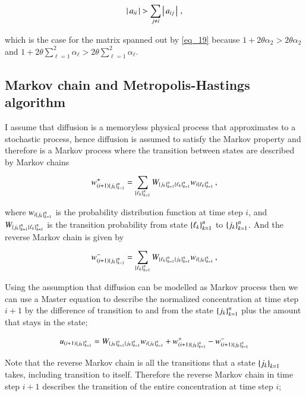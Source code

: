 \documentclass[11pt,english,a4paper]{article}
\begin{document}
\begin{flushleft}
\begin{align*}
\left\vert{\,a_{ii}\,}\right\vert > \sum_{j\neq i} \left\vert{\,a_{ij}\,}\right\vert\,,
\end{align*}

which is the case for the matrix spanned out by \eqref{eq_19} because $1+2\theta \alpha_2 > 2\theta \alpha_2$ and $1+2\theta\sum_{\ell=1}^2 \alpha_{\ell} > 2\theta\sum_{\ell=1}^2 \alpha_\ell$.

\subsection{Markov chain and Metropolis-Hastings algorithm}

I assume that diffusion is a memoryless physical process that approximates to a stochastic process, hence diffusion is assumed to satisfy the Markov property and therefore is a Markov process where the transition between states are described by Markov chains 

\begin{align}
w_{(i+1)\left\lbrace{j_k}\right\rbrace_{k=1}^n}^+ = \sum_{\left\lbrace{\ell_k}\right\rbrace_{k=1}^n} W_{\left\lbrace{j_k}\right\rbrace_{k=1}^n\left\lbrace{\ell_k}\right\rbrace_{k=1}^n} w_{i\left\lbrace{\ell_k}\right\rbrace_{k=1}^n} \,,
\label{eq_34}
\end{align}

where $w_{i\left\lbrace{j_k}\right\rbrace_{k=1}^n}$ is the probability distribution function  at time step $i$, and $W_{\left\lbrace{j_k}\right\rbrace_{k=1}^n\left\lbrace{\ell_k}\right\rbrace_{k=1}^n}$  is the transition probability from state $\left\lbrace{\ell_k}\right\rbrace_{k=1}^n$ to $\left\lbrace{j_k}\right\rbrace_{k=1}^n$. And the reverse Markov chain is given by

\begin{align}
w_{(i+1)\left\lbrace{j_k}\right\rbrace_{k=1}^n}^- = \sum_{\left\lbrace{\ell_k}\right\rbrace_{k=1}^n} W_{\left\lbrace{\ell_k}\right\rbrace_{k=1}^n\left\lbrace{j_k}\right\rbrace_{k=1}^n} w_{i\left\lbrace{j_k}\right\rbrace_{k=1}^n} \,,
\label{eq_35}
\end{align}

Using the assumption that diffusion can be modelled as Markov process then we can use a Master equation to describe the normalized concentration at time step $i+1$ by the difference of transition to and from the state $\left\lbrace{j_k}\right\rbrace_{k=1}^n$ plus the amount that stays in the state; 

\begin{align}
u_{(i+1)\left\lbrace{j_k}\right\rbrace_{k=1}^n} = W_{\left\lbrace{j_k}\right\rbrace_{k=1}^n\left\lbrace{j_k}\right\rbrace_{k=1}^n} w_{i\left\lbrace{j_k}\right\rbrace_{k=1}^n} +  w_{(i+1)\left\lbrace{j_k}\right\rbrace_{k=1}^n}^+ - w_{(i+1)\left\lbrace{j_k}\right\rbrace_{k=1}^n}^-
\label{eq_36}
\end{align} 

Note that the reverse Markov chain is all the transitions that a state $\left\lbrace{j_k}\right\rbrace_{k=1}$ takes, including transition to itself. Therefore the reverse Markov chain in time step $i+1$ describes the transition of the entire concentration at time step $i$;


\end{flushleft}
\end{document}

